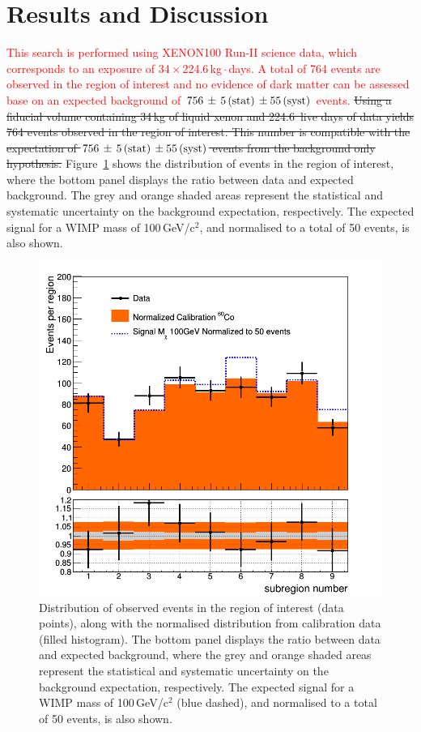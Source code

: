 \section{Results and Discussion}
\label{sec:results}

\textcolor{red} {This search is performed using XENON100 Run-II science data, which corresponds to an exposure of 34\,$\times$\,224.6\,kg\,$\cdot$\,days. 
A total of 764 events are observed in the region of interest and no evidence of dark matter can be assessed base on an expected background of
$756 \, \pm \, 5 \,{\rm (stat)} \, \pm 55\, {\rm (syst)}$ events. }
\sout{Using a fiducial volume containing 34\,kg of liquid xenon and 224.6~live days of data yields 764 events observed  in the region of interest.
This number is compatible with the expectation of $756 \, \pm \, 5 \,{\rm (stat)} \, \pm 55\, {\rm (syst)}$ events from the background only hypothesis.} 
Figure~\ref{fig:dataVSbkg} shows the distribution of  events  in the region of interest, where the bottom panel displays the ratio
between data and expected background. The grey and orange shaded areas represent the statistical and systematic uncertainty 
on the background expectation, respectively. The expected signal for a WIMP mass of 100\,GeV/c$^2$, and normalised to a total of 50 events, is also shown.


\begin{figure}[t!]
  \includegraphics[width=\linewidth]{images/data_vs_bkg.png}
  \caption{Distribution of  observed events  in the region of interest (data points), along with the normalised distribution from calibration data (filled histogram). The bottom panel displays the ratio
between data and expected background, where the grey and orange shaded areas represent the statistical and systematic uncertainty 
on the background expectation, respectively. The expected signal for a WIMP mass of 100\,GeV/c$^2$ (blue dashed), and normalised to a total of 50 events, is also shown.}
  \label{fig:dataVSbkg}
\end{figure}

